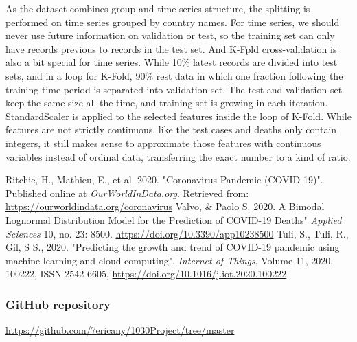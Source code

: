 \documentclass[11pt]{article}
\begin{document}
As the dataset combines group and time series structure, the splitting is performed on time series grouped by country names. For time series, we should never use future information on validation or test, so the training set can only have records previous to records in the test set. And K-Fpld cross-validation is also a bit special for time series. While 10\%  latest records are divided into test sets, and in a loop for K-Fold, 90\% rest data in which one fraction following the training time period is separated into validation set. The test and validation set keep the same size all the time, and training set is growing in each iteration. \\

StandardScaler is applied to the selected features inside the loop of K-Fold. While features are not strictly continuous, like the test cases and deaths only contain integers, it still makes sense to approximate those features with continuous variables instead of ordinal data, transferring the exact number to a kind of ratio. 

\begin{thebibliography}{99}
	Ritchie, H., Mathieu, E., et al. 2020. "Coronavirus Pandemic (COVID-19)". Published online at {\em OurWorldInData.org}. Retrieved from: \url{https://ourworldindata.org/coronavirus}
	Valvo, \& Paolo S. 2020. A Bimodal Lognormal Distribution Model for the Prediction of COVID-19 Deaths" {\em Applied Sciences }10, no. 23: 8500. \url{https://doi.org/10.3390/app10238500}
	 Tuli, S., Tuli, R., Gil, S S., 2020. "Predicting the growth and trend of COVID-19 pandemic using machine learning and cloud computing". {\em Internet of Things},
Volume 11,
2020,
100222,
ISSN 2542-6605,
	\url{https://doi.org/10.1016/j.iot.2020.100222}.
\end{thebibliography}
\subsubsection*{GitHub repository } 
\url{https://github.com/7ericany/1030Project/tree/master}
\end{document}
